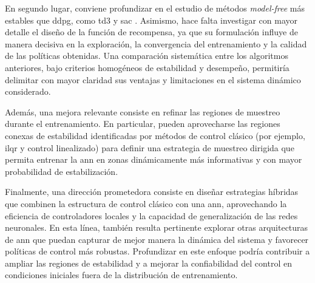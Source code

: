 En segundo lugar, conviene profundizar en el estudio de métodos \textit{model-free} más estables que \acrshort{ddpg}, como \acrshort{td3} \cite{fujimoto2018} y \acrshort{sac} \cite{haarnoja2018}. Asimismo, hace falta investigar con mayor detalle el diseño de la función de recompensa, ya que su formulación influye de manera decisiva en la exploración, la convergencia del entrenamiento y la calidad de las políticas obtenidas. Una comparación sistemática entre los algoritmos anteriores, bajo criterios homogéneos de estabilidad y desempeño, permitiría delimitar con mayor claridad sus ventajas y limitaciones en el sistema dinámico considerado.

Además, una mejora relevante consiste en refinar las regiones de muestreo durante el entrenamiento. En particular, pueden aprovecharse las regiones conexas de estabilidad identificadas por métodos de control clásico (por ejemplo, \acrshort{ilqr} y control linealizado) para definir una estrategia de muestreo dirigida que permita entrenar la \acrshort{ann} en zonas dinámicamente más informativas y con mayor probabilidad de estabilización.

Finalmente, una dirección prometedora consiste en diseñar estrategias híbridas que combinen la estructura de control clásico con una \acrshort{ann}, aprovechando la eficiencia de controladores locales y la capacidad de generalización de las redes neuronales. En esta línea, también resulta pertinente explorar otras arquitecturas de \acrshort{ann} que puedan capturar de mejor manera la dinámica del sistema y favorecer políticas de control más robustas. Profundizar en este enfoque podría contribuir a ampliar las regiones de estabilidad y a mejorar la confiabilidad del control en condiciones iniciales fuera de la distribución de entrenamiento.

\appendix
